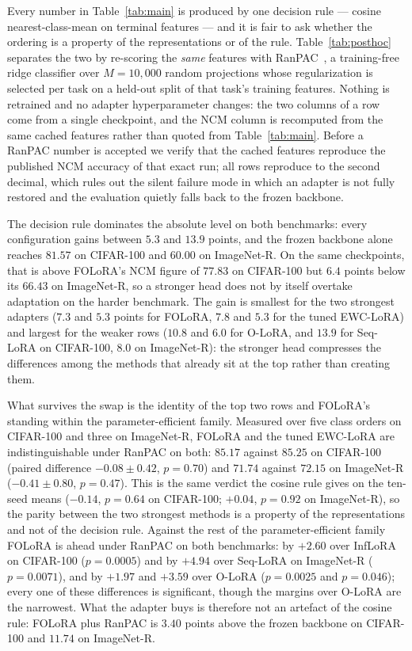 Every number in Table~\ref{tab:main} is produced by one decision rule --- cosine
nearest-class-mean on terminal features --- and it is fair to ask whether the ordering is a
property of the representations or of the rule. Table~\ref{tab:posthoc} separates the two by
re-scoring the \emph{same} features with RanPAC~\cite{mcdonnell2023ranpac}, a training-free
ridge classifier over $M{=}10{,}000$ random projections whose regularization is selected per
task on a held-out split of that task's training features. Nothing is retrained and no adapter
hyperparameter changes: the two columns of a row come from a single checkpoint, and the NCM
column is recomputed from the same cached features rather than quoted from
Table~\ref{tab:main}. Before a RanPAC number is accepted we verify that the cached features
reproduce the published NCM accuracy of that exact run; all rows reproduce to the second
decimal, which rules out the silent failure mode in which an adapter is not fully restored and
the evaluation quietly falls back to the frozen backbone.



The decision rule dominates the absolute level on both benchmarks: every configuration gains
between $5.3$ and $13.9$ points, and the frozen backbone alone reaches $81.57$ on CIFAR-100 and
$60.00$ on ImageNet-R. On the same checkpoints, that is above FOLoRA's NCM figure of $77.83$ on
CIFAR-100 but $6.4$ points below its $66.43$ on ImageNet-R, so a stronger head does not by itself
overtake adaptation on the harder benchmark.
The gain is smallest for the two strongest adapters ($7.3$ and $5.3$
points for FOLoRA, $7.8$ and $5.3$ for the tuned EWC-LoRA) and largest for the weaker rows ($10.8$
and $6.0$ for O-LoRA, and $13.9$ for Seq-LoRA on CIFAR-100, $8.0$ on ImageNet-R): the stronger
head compresses the differences among the methods that already sit at the top rather than
creating them.

What survives the swap is the identity of the top two rows and FOLoRA's standing within the
parameter-efficient family. Measured over five class orders on CIFAR-100 and three on
ImageNet-R, FOLoRA and the
tuned EWC-LoRA are indistinguishable under RanPAC on both: $85.17$ against $85.25$ on CIFAR-100
(paired difference $-0.08\pm0.42$, $p=0.70$) and $71.74$ against $72.15$ on ImageNet-R
($-0.41\pm0.80$, $p=0.47$). This is the same verdict the cosine rule gives on the ten-seed means
($-0.14$, $p=0.64$ on CIFAR-100; $+0.04$, $p=0.92$ on ImageNet-R), so the parity between the two
strongest methods is a property of the representations and not of the decision rule. Against the
rest of the parameter-efficient family FOLoRA is ahead under RanPAC on both benchmarks: by
$+2.60$ over InfLoRA on CIFAR-100 ($p=0.0005$) and by $+4.94$ over Seq-LoRA on ImageNet-R
($p=0.0071$), and by $+1.97$ and $+3.59$ over O-LoRA ($p=0.0025$ and $p=0.046$); every one of
these differences is significant, though the margins over O-LoRA are the narrowest.
What the adapter buys is therefore not an artefact of the cosine rule:
FOLoRA plus RanPAC is $3.40$ points above the frozen backbone on CIFAR-100 and $11.74$ on
ImageNet-R.

